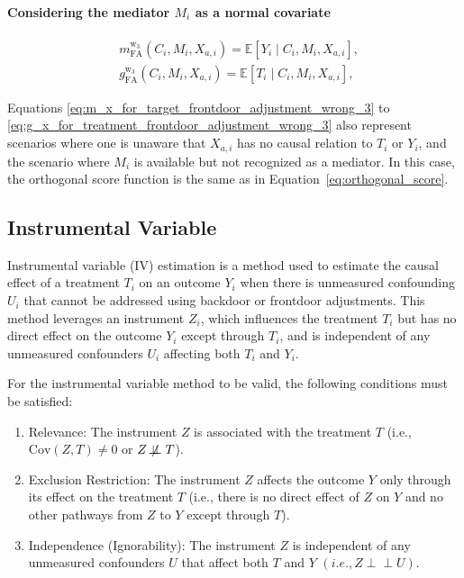 \documentclass{article}
\numberwithin{equation}{section}
\begin{document}
\paragraph{Considering the mediator $M_i$ as a normal covariate}

\begin{align}
    & m_{\text{FA}}^{\text{w}_3}(C_i, M_i, X_{a, i}) = \mathbb{E}[Y_i \mid C_i, M_i, X_{a, i}],
    \label{eq:m_x_for_target_frontdoor_adjustment_wrong_3} \\
    & g_{\text{FA}}^{\text{w}_3}(C_i, M_i, X_{a, i}) = \mathbb{E}[T_i \mid C_i, M_i, X_{a, i}],
    \label{eq:g_x_for_treatment_frontdoor_adjustment_wrong_3}
\end{align}

Equations \eqref{eq:m_x_for_target_frontdoor_adjustment_wrong_3} to \eqref{eq:g_x_for_treatment_frontdoor_adjustment_wrong_3} also represent scenarios where one is unaware that $X_{a, i}$ has no causal relation to $T_i$ or $Y_i$, and the scenario where $M_i$ is available but not recognized as a mediator. In this case, the orthogonal score function is the same as in Equation~\eqref{eq:orthogonal_score}.

\subsection{Instrumental Variable}

Instrumental variable (IV) estimation is a method used to estimate the causal effect of a treatment $T_i$ on an outcome $Y_i$ when there is unmeasured confounding $U_i$ that cannot be addressed using backdoor or frontdoor adjustments. This method leverages an instrument $Z_i$, which influences the treatment $T_i$ but has no direct effect on the outcome $Y_i$  except through $T_i$, and is independent of any unmeasured confounders $U_i$ affecting both $T_i$ and $Y_i$.

For the instrumental variable method to be valid, the following conditions must be satisfied:

\begin{enumerate}
\item Relevance: The instrument $Z$ is associated with the treatment  $T$  (i.e.,  $\text{Cov}(Z, T) \neq 0$  or \( Z \not\!\perp\!\!\!\perp T \)).
\item Exclusion Restriction: The instrument $Z$ affects the outcome $Y$ only through its effect on the treatment $T$ (i.e., there is no direct effect of $Z$ on $Y$ and no other pathways from $Z$ to $Y$ except through  $T$).
\item Independence (Ignorability): The instrument $Z$ is independent of any unmeasured confounders $U$ that affect both $T$ and $Y$ $(i.e.,  Z \perp\!\!\!\perp U )$.
\end{enumerate}
\end{document}

